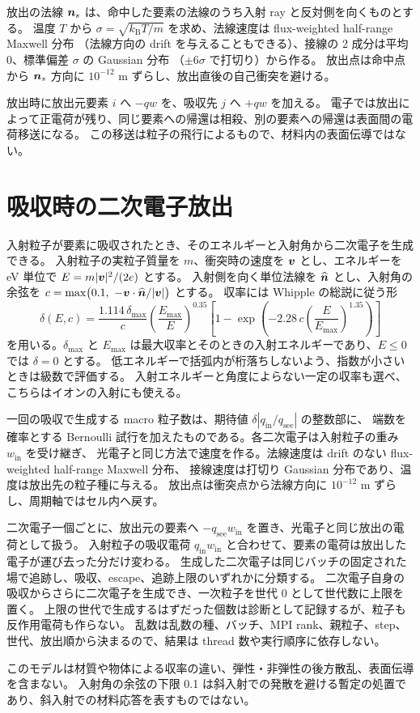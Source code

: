 放出の法線 $\bm{n}_s$ は、命中した要素の法線のうち入射 ray と反対側を向くものとする。
温度 $T$ から $\sigma=\sqrt{k_{\mathrm B}T/m}$ を求め、法線速度は flux-weighted half-range Maxwell 分布
（法線方向の drift を与えることもできる）、接線の 2 成分は平均 0、標準偏差 $\sigma$ の Gaussian 分布
（$\pm6\sigma$ で打切り）から作る。
放出点は命中点から $\bm{n}_s$ 方向に $10^{-12}$ m ずらし、放出直後の自己衝突を避ける。

放出時に放出元要素 $i$ へ $-q w$ を、吸収先 $j$ へ $+q w$ を加える。
電子では放出によって正電荷が残り、同じ要素への帰還は相殺、別の要素への帰還は表面間の電荷移送になる。
この移送は粒子の飛行によるもので、材料内の表面伝導ではない。

\section{吸収時の二次電子放出}
\label{sec:secondary_emission}
入射粒子が要素に吸収されたとき、そのエネルギーと入射角から二次電子を生成できる。
入射粒子の実粒子質量を $m$、衝突時の速度を $\bm{v}$ とし、エネルギーを eV 単位で $E=m|\bm{v}|^2/(2e)$ とする。
入射側を向く単位法線を $\widehat{\bm{n}}$ とし、入射角の余弦を $c=\max\bigl(0.1,\ -\bm{v}\cdot\widehat{\bm{n}}/|\bm{v}|\bigr)$ とする。
収率には Whipple の総説\citep{Whipple1981}に従う形
\begin{equation}
 \delta(E,c)=\frac{1.114\,\delta_{\max}}{c}\left(\frac{E_{\max}}{E}\right)^{0.35}
 \left[1-\exp\!\left(-2.28\,c\left(\frac{E}{E_{\max}}\right)^{1.35}\right)\right]
 \label{eq:see_yield}
\end{equation}
を用いる\citep{Marchand2014}。$\delta_{\max}$ と $E_{\max}$ は最大収率とそのときの入射エネルギーであり、$E\le0$ では $\delta=0$ とする。
低エネルギーで括弧内が桁落ちしないよう、指数が小さいときは級数で評価する。
入射エネルギーと角度によらない一定の収率も選べ、こちらはイオンの入射にも使える。

一回の吸収で生成する macro 粒子数は、期待値 $\delta|q_{\mathrm{in}}/q_{\mathrm{see}}|$ の整数部に、
端数を確率とする Bernoulli 試行を加えたものである。各二次電子は入射粒子の重み $w_{\mathrm{in}}$ を受け継ぎ、
光電子と同じ方法で速度を作る。法線速度は drift のない flux-weighted half-range Maxwell 分布、
接線速度は打切り Gaussian 分布であり、温度は放出先の粒子種に与える。
放出点は衝突点から法線方向に $10^{-12}$ m ずらし、周期軸ではセル内へ戻す。

二次電子一個ごとに、放出元の要素へ $-q_{\mathrm{see}}w_{\mathrm{in}}$ を置き、光電子と同じ放出の電荷として扱う。
入射粒子の吸収電荷 $q_{\mathrm{in}}w_{\mathrm{in}}$ と合わせて、要素の電荷は放出した電子が運び去った分だけ変わる。
生成した二次電子は同じバッチの固定された場で追跡し、吸収、escape、追跡上限のいずれかに分類する。
二次電子自身の吸収からさらに二次電子を生成でき、一次粒子を世代 0 として世代数に上限を置く。
上限の世代で生成するはずだった個数は診断として記録するが、粒子も反作用電荷も作らない。
乱数は乱数の種、バッチ、MPI rank、親粒子、step、世代、放出順から決まるので、結果は thread 数や実行順序に依存しない。

このモデルは材質や物体による収率の違い、弾性・非弾性の後方散乱、表面伝導を含まない。
入射角の余弦の下限 0.1 は斜入射での発散を避ける暫定の処置であり、斜入射での材料応答を表すものではない。
